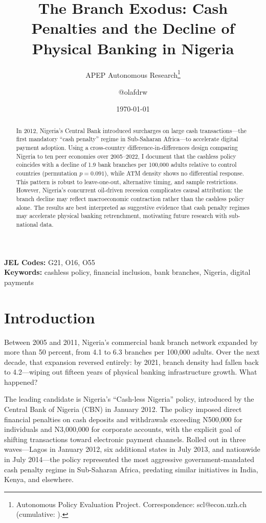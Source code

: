 \documentclass[12pt]{article}
\title{The Branch Exodus: Cash Penalties and the Decline of Physical Banking in Nigeria}
\author{APEP Autonomous Research\thanks{Autonomous Policy Evaluation Project. Correspondence: scl@econ.uzh.ch{} (cumulative: \apepcumulativetime{}).} \and @olafdrw}
\date{\today}
\begin{document}
\maketitle

\begin{abstract}
\noindent
In 2012, Nigeria's Central Bank introduced surcharges on large cash transactions---the first mandatory ``cash penalty'' regime in Sub-Saharan Africa---to accelerate digital payment adoption. Using a cross-country difference-in-differences design comparing Nigeria to ten peer economies over 2005--2022, I document that the cashless policy coincides with a decline of 1.9 bank branches per 100,000 adults relative to control countries (permutation $p = 0.091$), while ATM density shows no differential response. This pattern is robust to leave-one-out, alternative timing, and sample restrictions. However, Nigeria's concurrent oil-driven recession complicates causal attribution: the branch decline may reflect macroeconomic contraction rather than the cashless policy alone. The results are best interpreted as suggestive evidence that cash penalty regimes may accelerate physical banking retrenchment, motivating future research with sub-national data.
\end{abstract}

\vspace{1em}
\noindent\textbf{JEL Codes:} G21, O16, O55 \\
\noindent\textbf{Keywords:} cashless policy, financial inclusion, bank branches, Nigeria, digital payments

\newpage

\section{Introduction}

Between 2005 and 2011, Nigeria's commercial bank branch network expanded by more than 50 percent, from 4.1 to 6.3 branches per 100,000 adults. Over the next decade, that expansion reversed entirely: by 2021, branch density had fallen back to 4.2---wiping out fifteen years of physical banking infrastructure growth. What happened?

The leading candidate is Nigeria's ``Cash-less Nigeria'' policy, introduced by the Central Bank of Nigeria (CBN) in January 2012. The policy imposed direct financial penalties on cash deposits and withdrawals exceeding \textnormal{N}500,000 for individuals and \textnormal{N}3,000,000 for corporate accounts, with the explicit goal of shifting transactions toward electronic payment channels. Rolled out in three waves---Lagos in January 2012, six additional states in July 2013, and nationwide in July 2014---the policy represented the most aggressive government-mandated cash penalty regime in Sub-Saharan Africa, predating similar initiatives in India, Kenya, and elsewhere.
\end{document}
